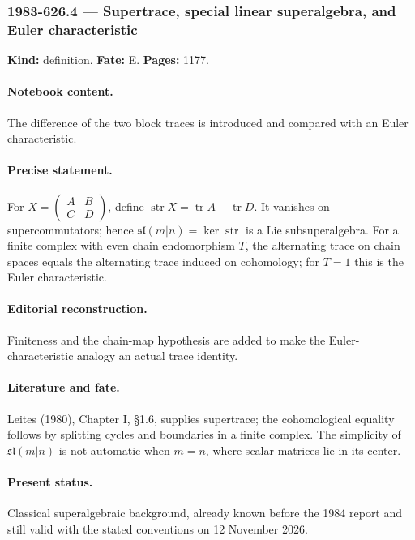 \subsubsection{1983-626.4 --- Supertrace, special linear superalgebra, and Euler characteristic}

\label{item:1983-626.4}

\noindent\textbf{Kind:} definition. \textbf{Fate:} E. \textbf{Pages:} 1177.\par

\paragraph{Notebook content.} The difference of the two block traces is introduced and compared with an Euler characteristic.

\paragraph{Precise statement.} For \(X=\begin{pmatrix}A&B\\C&D\end{pmatrix}\), define \(\operatorname{str}X=\operatorname{tr}A-\operatorname{tr}D\). It vanishes on supercommutators; hence \(\mathfrak{sl}(m|n)=\ker\operatorname{str}\) is a Lie subsuperalgebra. For a finite complex with even chain endomorphism \(T\), the alternating trace on chain spaces equals the alternating trace induced on cohomology; for \(T=1\) this is the Euler characteristic.

\paragraph{Editorial reconstruction.} Finiteness and the chain-map hypothesis are added to make the Euler-characteristic analogy an actual trace identity.

\paragraph{Literature and fate.} Leites (1980), Chapter I, \S1.6, supplies supertrace; the cohomological equality follows by splitting cycles and boundaries in a finite complex. The simplicity of \(\mathfrak{sl}(m|n)\) is not automatic when \(m=n\), where scalar matrices lie in its center.

\paragraph{Present status.} Classical superalgebraic background, already known before the 1984 report and still valid with the stated conventions on 12 November 2026.

